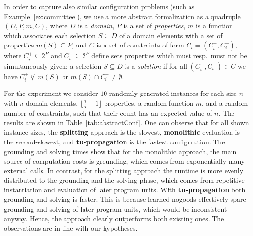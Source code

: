 \documentclass[11pt,fleqn,twoside]{article}
\begin{document}
			In order to capture also similar configuration problems (such as Example~\ref{ex:committee}),
			we use a more abstract formalization as a quadruple $(D, P, m, C)$,
			where $D$ is a \emph{domain}, $P$ is a set of \emph{properties},
			$m$ is a function which associates each selection $S \subseteq D$ of a domain elements with a set of properties $m(S) \subseteq P$,
			and $C$ is a set of constraints of form $C_i = (C_i^{+}, C_i^{-})$, where $C_i^{+} \subseteq 2^P$ and $C_i^{-} \subseteq 2^P$
			define sets properties which must resp.~must not be simultaneously given;
			a selection $S \subseteq D$ is a \emph{solution} if for all $(C_i^{+}, C_i^{-}) \in C$
			we have $C_i^{+} \not\subseteq m(S)$ or $m(S) \cap C_i^{-} \not= \emptyset$.

			For the experiment we consider $10$ randomly generated instances for each size $n$
			with $n$ domain elements, $\lfloor \frac{n}{5} + 1 \rfloor$ properties, a random function $m$, and a random number of constraints,
			such that their count has an expected value of $n$.
			The results are shown in Table~\ref{tab:abstractConf}.
			One can observe that for all shown instance sizes, the \textbf{splitting} approach is the slowest, \textbf{monolithic} evaluation is the second-slowest,
			and \textbf{tu-propagation} is the fastest configuration.
			The grounding and solving times show that for the monolithic approach, the main source of computation costs is grounding,
			which comes from exponentially many external calls.
			In contrast, for the splitting approach the runtime is more evenly distributed to the grounding and the solving phase,
			which comes from repetitive instantiation and evaluation of later program units.
			With \textbf{tu-propagation} both grounding and solving is faster.
			This is because learned nogoods effectively spare grounding and solving of later program units, which would be inconsistent anyway.
			Hence, the approach clearly outperforms both existing ones. The observations are in line with our hypotheses.
\end{document}
